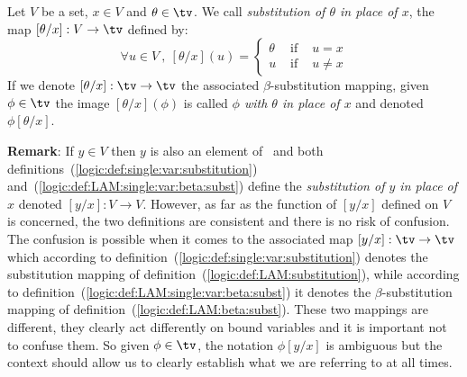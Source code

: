 \begin{defin}\label{logic:def:LAM:single:var:beta:subst}
    Let $V$ be a set, $x\in V$ and $\theta\in\tv$. We call {\em substitution 
    of $\theta$ in place of $x$}, the map $[\theta/x]:V\to\tv$ defined by:
        \[
            \forall u\in V\ ,\ [\theta/x](u)=
                \left\{
                    \begin{array}{lcl}
                        \theta&\mbox{\ if\ }&u=x\\
                        u&\mbox{\ if\ }&u\neq x
                    \end{array}
                \right.
        \]
    If we denote $[\theta/x]:\tv\to\tv$ the associated $\beta$-substitution 
    mapping, given $\phi\in\tv$ the image $[\theta/x](\phi)$ is called
    {\em $\phi$ with $\theta$ in place of $x$} and denoted $\phi[\theta/x]$.
\end{defin}
{\bf Remark}: If $y\in V$ then $y$ is also an element of \tv\ and both
definitions~(\ref{logic:def:single:var:substitution}) 
and~(\ref{logic:def:LAM:single:var:beta:subst}) define the {\em substitution
of $y$ in place of $x$} denoted $[y/x]:V\to V$. However, as far as the
function of $[y/x]$ defined on $V$ is concerned, the two definitions are 
consistent and there is no risk of confusion. The confusion is possible
when it comes to the associated map $[y/x]:\tv\to\tv$ which according to
definition~(\ref{logic:def:single:var:substitution}) denotes the 
substitution mapping of definition~(\ref{logic:def:LAM:substitution}), while
according to definition~(\ref{logic:def:LAM:single:var:beta:subst}) it denotes
the $\beta$-substitution mapping of definition~(\ref{logic:def:LAM:beta:subst}).
These two mappings are different, they clearly act differently on bound
variables and it is important not to confuse them. So given $\phi\in\tv$,
the notation $\phi[y/x]$ is ambiguous but the context should allow us
to clearly establish what we are referring to at all times.
